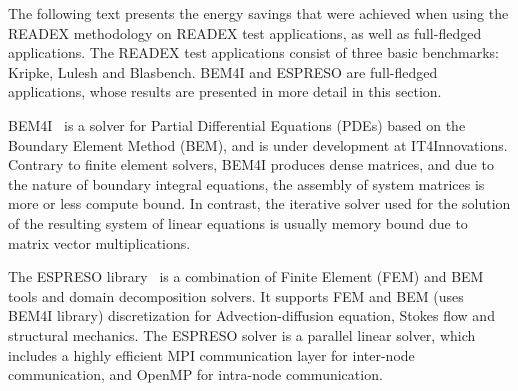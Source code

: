 

The following text presents the energy savings that were achieved when using the READEX methodology on READEX test applications, as well as full-fledged applications. The READEX test applications consist of three basic benchmarks: Kripke, Lulesh and Blasbench. BEM4I and ESPRESO are full-fledged applications, whose results are presented in more detail in this section. 

BEM4I~\cite{ch6_MerZap2013} is a solver for Partial Differential Equations (PDEs) based on the Boundary Element Method (BEM), and is under development at IT4Innovations. Contrary to finite element solvers, BEM4I produces dense matrices, and due to the nature of boundary integral equations, the assembly of system matrices is more or less compute bound. In contrast, the iterative solver used for the solution of the resulting system of linear equations is usually memory bound due to matrix vector multiplications.

The ESPRESO library~\cite{ESPRESOijhpca} is a combination of Finite Element (FEM) and BEM tools and domain decomposition solvers. It supports FEM and BEM (uses BEM4I library) discretization for Advection-diffusion equation, Sto\-kes flow and structural mechanics. The ESPRESO solver is a parallel linear solver, which includes a highly efficient MPI communication layer for inter-node communication, and OpenMP for intra-node communication.

